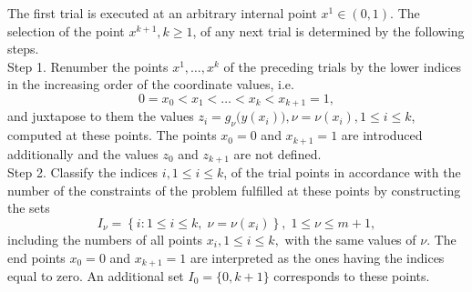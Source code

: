\documentclass[preprint]{elsarticle}
\begin{document}
	The first trial is executed at an arbitrary internal point $x^1 \in (0,1)$. The selection of the point $ x^{k+1}, k \geq 1$, of any next trial is determined by the following steps. \\
Step 1. Renumber the points $x^1, \ldots, x^k$ of the preceding trials by the lower indices in the increasing order of the coordinate values, i.e.
$$
	0=x_0<x_1<\dots <x_k<x_{k+1}=1,
$$
and juxtapose to them the values $z_i=g_{\nu}\big(y(x_i)\big),\nu=\nu(x_i), 1 \leq i \leq k$, computed at these points. The points $x_0=0$ and $x_{k+1}=1$ are introduced additionally and the values $z_0$ and $z_{k+1}$ are not defined. \\
Step 2. Classify the indices $i, 1 \leq i \leq k$, of the trial points in accordance with the number of the constraints of the problem fulfilled at these points by constructing the sets
$$
	I_\nu =\left\{i:1 \leq i \leq k, \; \nu=\nu(x_i) \right\}, \; 1 \leq \nu \leq m+1,
$$
including the numbers of all points $x_i, 1 \leq i \leq k,$ with the same values of $\nu$. The end points $x_0=0$ and $x_{k+1}=1$ are interpreted as the ones having the indices equal to zero. An additional set $I_0=\{0, k+1\}$ corresponds to these points.
\end{document}
